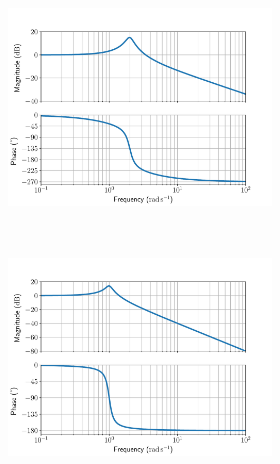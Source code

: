 \documentclass[11pt, reqno]{article}    %
\begin{document}
\begin{figure}[h]
    \centering
    \begin{subfigure}{0.38\textwidth}
        \centering
        \begin{subfigure}[htbp]{\textwidth} 
            \includegraphics[width=\textwidth]{figures/G3_bode.pdf} 
        \end{subfigure}\\
        \begin{subfigure}[htbp]{\textwidth} 
            \includegraphics[width=\textwidth]{figures/G1_bode.pdf} 
        \end{subfigure} \\
        \begin{subfigure}[htbp]{\textwidth} 

\end{subfigure}
\end{subfigure}
\end{figure}
\end{document}
